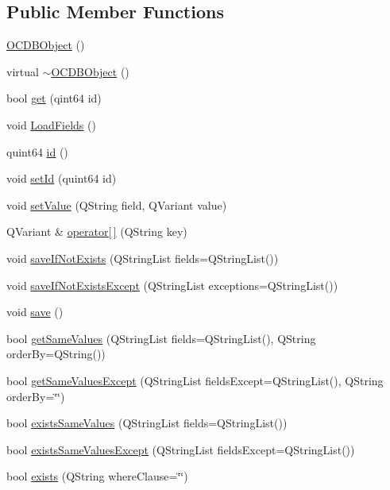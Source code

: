 \subsection*{\-Public \-Member \-Functions}
\begin{DoxyCompactItemize}
\item 
\hyperlink{classormcore_1_1_o_c_d_b_object_a46280068ed1abcb08c5f614e787e4dba}{\-O\-C\-D\-B\-Object} ()
\item 
virtual \hyperlink{classormcore_1_1_o_c_d_b_object_a663934fbb05460513439521ef8eadb63}{$\sim$\-O\-C\-D\-B\-Object} ()
\item 
bool \hyperlink{classormcore_1_1_o_c_d_b_object_a7e2e9c0820bc66189a1bcf6efca053d2}{get} (qint64 id)
\item 
void \hyperlink{classormcore_1_1_o_c_d_b_object_a3c51b31ed3af8f9c053f18a8a273629c}{\-Load\-Fields} ()
\item 
quint64 \hyperlink{classormcore_1_1_o_c_d_b_object_a874b6393a9eec12bcca0223498222c19}{id} ()
\item 
void \hyperlink{classormcore_1_1_o_c_d_b_object_abf952a522671d2b77c7098e19854843d}{set\-Id} (quint64 id)
\item 
void \hyperlink{classormcore_1_1_o_c_d_b_object_a8ce6b4690c5fb6f0fba1a8f1d1e2b3fb}{set\-Value} (\-Q\-String field, \-Q\-Variant value)
\item 
\-Q\-Variant \& \hyperlink{classormcore_1_1_o_c_d_b_object_a989b2d6257bf82aaa38f8d15d3d83c2c}{operator\mbox{[}$\,$\mbox{]}} (\-Q\-String key)
\item 
void \hyperlink{classormcore_1_1_o_c_d_b_object_afb6673d0d57d70513847db564915ef78}{save\-If\-Not\-Exists} (\-Q\-String\-List fields=\-Q\-String\-List())
\item 
void \hyperlink{classormcore_1_1_o_c_d_b_object_ac90983398799a3181e145f8057a608ab}{save\-If\-Not\-Exists\-Except} (\-Q\-String\-List exceptions=\-Q\-String\-List())
\item 
void \hyperlink{classormcore_1_1_o_c_d_b_object_adf3f8d09d2cda13348e9834144916e45}{save} ()
\item 
bool \hyperlink{classormcore_1_1_o_c_d_b_object_acb0dd02e72d5714014f7b9856f38db18}{get\-Same\-Values} (\-Q\-String\-List fields=\-Q\-String\-List(), \-Q\-String order\-By=\-Q\-String())
\item 
bool \hyperlink{classormcore_1_1_o_c_d_b_object_a1531bd979b94e095972579a9944734d9}{get\-Same\-Values\-Except} (\-Q\-String\-List fields\-Except=\-Q\-String\-List(), \-Q\-String order\-By=\char`\"{}\char`\"{})
\item 
bool \hyperlink{classormcore_1_1_o_c_d_b_object_a4a508cd7582d12587c81f938eacc7462}{exists\-Same\-Values} (\-Q\-String\-List fields=\-Q\-String\-List())
\item 
bool \hyperlink{classormcore_1_1_o_c_d_b_object_a5a0fbb8f89ed201d2625edd43647207f}{exists\-Same\-Values\-Except} (\-Q\-String\-List fields\-Except=\-Q\-String\-List())
\item 
bool \hyperlink{classormcore_1_1_o_c_d_b_object_ae3f5eb296ca8dfb03ee72fdf1cf5c199}{exists} (\-Q\-String where\-Clause=\char`\"{}\char`\"{})
\end{DoxyCompactItemize}
